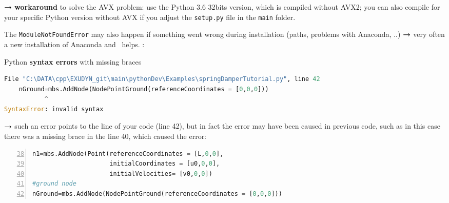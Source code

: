 		$\rightarrow$ {\bf workaround} to solve the AVX problem: use the Python 3.6 32bits version, which is compiled without AVX2; you can also compile for your specific Python version without AVX if you adjust the \texttt{setup.py} file in the \texttt{main} folder.
	  \item[] The \texttt{ModuleNotFoundError} may also happen if something went wrong during installation (paths, problems with Anaconda, ..) $\rightarrow$ very often a new installation of Anaconda and \codeName\ helps.
\ei
\newpage
:
\bi
  \item Python {\bf syntax errors} with missing braces
\pythonstyle
	{\ttfamily \footnotesize
	\begin{lstlisting}[language=Python, breaklines=true]
File "C:\DATA\cpp\EXUDYN_git\main\pythonDev\Examples\springDamperTutorial.py", line 42
    nGround=mbs.AddNode(NodePointGround(referenceCoordinates = [0,0,0]))
           ^
SyntaxError: invalid syntax
	\end{lstlisting}
	}
	\item[] $\rightarrow$ such an error points to the line of your code (line 42), but in fact the error may have
	been caused in previous code, such as in this case there was a missing brace in the line 40, which caused the error:
	{\ttfamily \footnotesize
	\begin{lstlisting}[language=Python, breaklines=true, firstnumber=38, numbers=left]
n1=mbs.AddNode(Point(referenceCoordinates = [L,0,0], 
                     initialCoordinates = [u0,0,0], 
                     initialVelocities= [v0,0,0])	
#ground node
nGround=mbs.AddNode(NodePointGround(referenceCoordinates = [0,0,0]))
  \end{lstlisting}
	}
\ei


